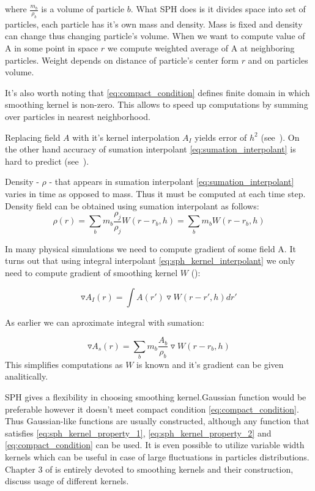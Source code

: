 where $\frac{m_b}{\rho_b}$ is a volume of particle $b$. What SPH does is it divides space into set of particles, each particle has it's own mass and density. Mass is fixed and density can change thus changing particle's volume. When we want to compute value of A in some point in space $r$ we compute weighted average of A at neighboring particles. Weight depends on distance of particle's center form $r$ and on particles volume. 

It's also worth noting that \ref{eq:compact_condition} defines finite domain in which smoothing kernel is non-zero. This allows to speed up computations by summing over particles in nearest neighborhood.

Replacing field $A$ with it's kernel interpolation $A_I$ yields error of $h^2$ (see~\cite[section 2.2.1]{Liu}). On the other hand accuracy of sumation interpolant \ref{eq:sumation_interpolant} is hard to predict (see~\cite[section 12.1]{Monaghan1992}).

Density - $\rho$ - that appears in sumation interpolant \ref{eq:sumation_interpolant} varies in time as opposed to mass. Thus it must be computed at each time step. Density field can be obtained using sumation interpolant as follows:
\begin{equation}
\label{eq:sph_density}
\rho(r) = \sum_{b}m_b\frac{\rho_j}{\rho_j}W(r-r_b, h) = \sum_{b}m_b W(r-r_b, h)
\end{equation}

In many physical simulations we need to compute gradient of some field A. It turns out that using integral interpolant \ref{eq:sph_kernel_interpolant} we only need to compute gradient of smoothing kernel $W$ (\cite[section 2.2.2]{Liu}):

\begin{equation}
\label{eq:integral_interpolant_gradient}
\triangledown A_I(r) = \int A(r') \triangledown W(r - r', h)dr'
\end{equation}

As earlier we can aproximate integral with sumation:

\begin{equation}
\label{eq:sumation_interpolant_gradient}
\triangledown A_s(r) = \sum_{b}m_b\frac{A_b}{\rho_b}\triangledown W(r-r_b,h) 
\end{equation}
This simplifies computations as $W$ is known and it's gradient can be given analitically. 

SPH gives a flexibility in choosing smoothing kernel.Gaussian function would be preferable however it doesn't meet compact condition \ref{eq:compact_condition}. Thus Gaussian-like functions are usually constructed, although any function that satisfies \ref{eq:sph_kernel_property_1}, \ref{eq:sph_kernel_property_2} and \ref{eq:compact_condition} can be used. It is even possible to utilize variable width kernels \cite[section 6]{Monaghan1992} which can be useful in case of large fluctuations in particles distributions. Chapter 3 of \cite{Liu} is entirely devoted to smoothing kernels and their construction, \cite[section 3.5]{Muller2003} discuss usage of different kernels. 

